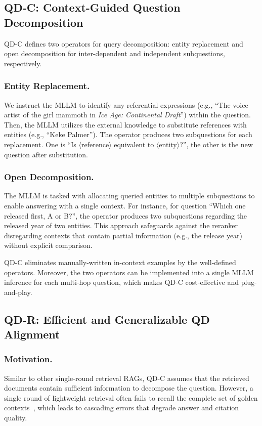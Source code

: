 \documentclass[letterpaper]{article} %
\begin{document}
\subsection{QD-C: Context-Guided Question Decomposition}

QD-C defines two operators for query decomposition: entity replacement and open decomposition for inter-dependent and independent subquestions, respectively.


\subsubsection{Entity Replacement.} 
We instruct the MLLM to identify any referential expressions (e.g., ``The voice artist of the girl mammoth in \emph{Ice Age: Continental Draft}'') within the question. Then, the MLLM utilizes the external knowledge to substitute references with entities (e.g., ``Keke Palmer''). 
The operator produces two subquestions for each replacement. One is ``Is $\langle$reference$\rangle$ equivalent to $\langle$entity$\rangle$?'', the other is the new question after substitution.  


\subsubsection{Open Decomposition.} The MLLM is tasked with allocating queried entities to multiple subquestions to enable answering with a single context. For instance, for question ``Which one released first, A or B?'', the operator produces two subquestions regarding the released year of two entities. This approach safeguards against the reranker disregarding contexts that contain partial information (e.g., the release year) without explicit comparison. 

QD-C eliminates manually-written in-context examples by the well-defined operators. Moreover, the two operators can be implemented into a single MLLM inference for each multi-hop question, which makes QD-C cost-effective and plug-and-play.


\subsection{QD-R: Efficient and Generalizable QD Alignment} \label{sec:qdr}

\subsubsection{Motivation.}
Similar to other single-round retrieval RAGs, QD-C assumes that the retrieved documents contain sufficient information to decompose the question. However, a single round of lightweight retrieval often fails to recall the complete set of golden contexts~\cite{yu2024rankrag}, which leads to cascading errors that degrade answer and citation quality. 
\end{document}
